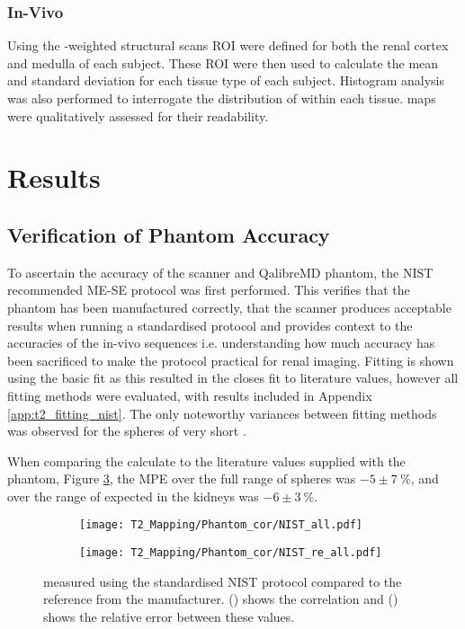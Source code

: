\subsubsection{In-Vivo}

Using the \tone-weighted structural scans \ac{ROI} were defined for both the renal cortex and medulla of each subject. These \ac{ROI} were then used to calculate the mean and standard deviation \ttwo for each tissue type of each subject. Histogram analysis was also performed to interrogate the distribution of \ttwo within each tissue. \ttwo maps were qualitatively assessed for their readability.

\newpage

\section{Results}

\subsection{Verification of Phantom Accuracy}
To ascertain the accuracy of the scanner and QalibreMD phantom, the \ac{NIST} recommended ME-SE protocol was first performed. This verifies that the phantom has been manufactured correctly, that the scanner produces acceptable results when running a standardised protocol and provides context to the accuracies of the in-vivo sequences i.e. understanding how much accuracy has been sacrificed to make the protocol practical for renal imaging. Fitting is shown using the basic fit as this resulted in the closes fit to literature values, however all fitting methods were evaluated, with results included in Appendix \ref{app:t2_fitting_nist}. The only noteworthy variances between fitting methods was observed for the spheres of very short \ttwo.

When comparing the \ttwo calculate to the literature values supplied with the phantom, Figure \ref{fig:t2_nist}, the \ac{MPE} over the full range of spheres was $-5 \pm 7~\%$, and over the range of \ttwo expected in the kidneys was $-6 \pm 3~\%$. 

\begin{figure}[H]
	\centering
	\begin{subfigure}[c]{0.47\textwidth}
		\centering
		\texttt{[image: T2\_Mapping/Phantom\_cor/NIST\_all.pdf]}
		\caption{}
		\label{fig:t2_nist_cor}
	\end{subfigure}
	\hfill
	\begin{subfigure}[c]{0.47\textwidth}
		\centering
		\texttt{[image: T2\_Mapping/Phantom\_cor/NIST\_re\_all.pdf]}
		\caption{}
		\label{fig:t2_nist_re}
	\end{subfigure}
	\caption{\ttwo measured using the standardised \ac{NIST} protocol compared to the reference \ttwo from the manufacturer. () shows the correlation and () shows the relative error between these values.}
	\label{fig:t2_nist}
\end{figure}
